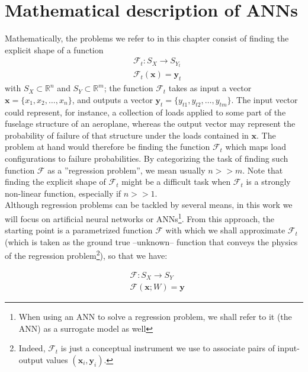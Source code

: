 \section{Mathematical description of ANNs}
\indent Mathematically, the problems we refer to in this chapter consist of finding the explicit shape of a function
\begin{align}\label{eq:F}
	& \mathcal{F}_{t}:S_X\rightarrow S_{Y_{t}} \\
	& \mathcal{F}_t(\mathbf{x})=\mathbf{y}_t
\end{align}
with $S_X\subset\mathbb{R}^n$ and $S_Y\subset\mathbb{R}^m$; \ie the function $\mathcal{F}_t$ takes as input a vector $\mathbf{x}=\{x_1,x_2,\ldots,x_n\}$, and outputs a vector $\mathbf{y}_t=\{y_{t1},y_{t2},\ldots,y_{tm}\}$. The input vector could represent, for instance, a collection of loads applied to some part of the fuselage structure of an aeroplane, whereas the output vector may represent the probability of failure of that structure under the loads contained in $\mathbf{x}$. The problem at hand would therefore be finding the function $\mathcal{F}_t$ which maps load configurations to failure probabilities. By categorizing the task of finding such function $\mathcal{F}$ as a ''regression problem'', we mean usually $n>>m$. Note that finding the explicit shape of $\mathcal{F}_t$ might be a difficult task when $\mathcal{F}_t$ is a strongly non-linear function, especially if $n>>1$.\\
%
\indent Although regression problems can be tackled by several means, in this work we will focus on artificial neural networks or ANNs\cite{Marsland2015Machine}\footnote{When using an ANN to solve a regression problem, we shall refer to it (the ANN) as a surrogate model as well}. From this approach, the starting point is a parametrized function $\mathcal{F}$ with which we shall approximate $\mathcal{F}_t$ (which is taken as the ground true --unknown-- function that conveys the physics of the regression problem\footnote{Indeed, $\mathcal{F}_t$ is just a conceptual instrument we use to associate pairs of input-output values $(\mathbf{x}_i,\mathbf{y}_i)$.}), so that we have:

\begin{align}
	& {\mathcal{F}} : S_X \rightarrow S_Y \\
	& {\mathcal{F}}(\mathbf{x}; W) = \mathbf{{y}} \label{eq:Fhat}
\end{align}

